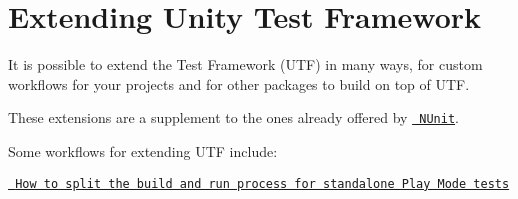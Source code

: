 \chapter{Extending Unity Test Framework}
\hypertarget{md__hey_tea_9_2_library_2_package_cache_2com_8unity_8test-framework_0d1_81_833_2_documentation_0i_2extending}{}\label{md__hey_tea_9_2_library_2_package_cache_2com_8unity_8test-framework_0d1_81_833_2_documentation_0i_2extending}
\label{md__hey_tea_9_2_library_2_package_cache_2com_8unity_8test-framework_0d1_81_833_2_documentation_0i_2extending_autotoc_md4202}%
%
It is possible to extend the  Test Framework (UTF) in many ways, for custom workflows for your projects and for other packages to build on top of UTF.

These extensions are a supplement to the ones already offered by \href{https://github.com/nunit/docs/wiki/Framework-Extensibility}{\texttt{ NUnit}}.

Some workflows for extending UTF include\+:
\begin{DoxyItemize}
\item \href{./reference-attribute-testplayerbuildmodifier.md\#split-build-and-run-for-player-mode-tests}{\texttt{ How to split the build and run process for standalone Play Mode tests}}
\item {}
\item {}
\item {}  
\end{DoxyItemize}